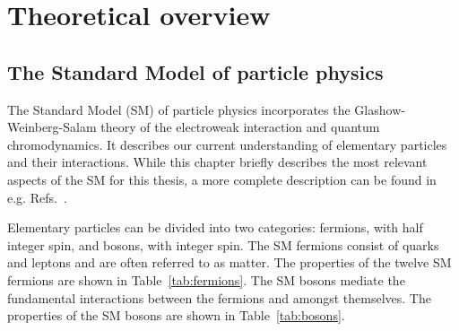 \section{Theoretical overview}
\label{sec:theory}


\subsection{The Standard Model of particle physics}
\label{sec:theory:overview}

The Standard Model (SM) of particle physics incorporates the Glashow-Weinberg-Salam theory of the electroweak interaction and quantum chromodynamics. It describes our current understanding of elementary particles and their interactions. While this chapter briefly describes the most relevant aspects of the SM for this thesis, a more complete description can be found in e.g. Refs.~\cite{griffiths,halzen,aitchison}.

Elementary particles can be divided into two categories: fermions, with half integer spin, and bosons, with integer spin. The SM fermions consist of quarks and leptons and are often referred to as matter. The properties of the twelve SM fermions are shown in Table~\ref{tab:fermions}. The SM bosons mediate the fundamental interactions between the fermions and amongst themselves. The properties of the SM bosons are shown in Table~\ref{tab:bosons}.

